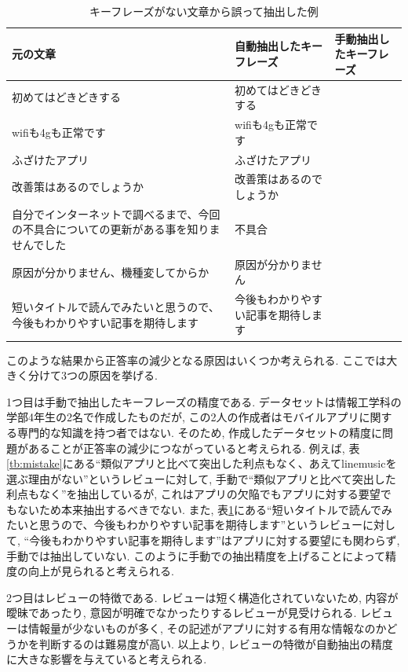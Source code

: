 \begin{table}[H]
  \caption{ キーフレーズがない文章から誤って抽出した例 }
  \label{tb:mistake2}
  \begin{center}
  \begin{tabularx}{\linewidth}{X|X|X}
    \hline
    元の文章&自動抽出したキーフレーズ&手動抽出したキーフレーズ\\\hline\hline
    初めてはどきどきする&初めてはどきどきする&\\\hline
    wifiも4gも正常です&wifiも4gも正常です&\\\hline
    ふざけたアプリ&ふざけたアプリ&\\\hline
    改善策はあるのでしょうか&改善策はあるのでしょうか&\\\hline
    自分でインターネットで調べるまで、今回の不具合についての更新がある事を知りませんでした&不具合&\\\hline
    原因が分かりません、機種変してからか&原因が分かりません&\\\hline
    短いタイトルで読んでみたいと思うので、今後もわかりやすい記事を期待します&今後もわかりやすい記事を期待します&\\\hline
  \end{tabularx}\end{center}
\end{table}

このような結果から正答率の減少となる原因はいくつか考えられる. ここでは大きく分けて3つの原因を挙げる. 

1つ目は手動で抽出したキーフレーズの精度である. データセットは情報工学科の学部4年生の2名で作成したものだが, この2人の作成者はモバイルアプリに関する専門的な知識を持つ者ではない. そのため, 作成したデータセットの精度に問題があることが正答率の減少につながっていると考えられる. 
例えば, 表\ref{tb:mistake}にある``類似アプリと比べて突出した利点もなく、あえてlinemusicを選ぶ理由がない''というレビューに対して, 手動で``類似アプリと比べて突出した利点もなく''を抽出しているが, これはアプリの欠陥でもアプリに対する要望でもないため本来抽出するべきでない. 
また, 表\ref{tb:mistake2}にある``短いタイトルで読んでみたいと思うので、今後もわかりやすい記事を期待します''というレビューに対して, ``今後もわかりやすい記事を期待します''はアプリに対する要望にも関わらず, 手動では抽出していない. このように手動での抽出精度を上げることによって精度の向上が見られると考えられる. 

2つ目はレビューの特徴である. レビューは短く構造化されていないため, 内容が曖昧であったり, 意図が明確でなかったりするレビューが見受けられる. レビューは情報量が少ないものが多く, その記述がアプリに対する有用な情報なのかどうかを判断するのは難易度が高い. 
以上より, レビューの特徴が自動抽出の精度に大きな影響を与えていると考えられる. 

